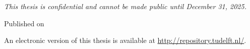 \begin{titlepage}
\begin{center}
        \bigskip
        \bigskip
        \emph{This thesis is confidential and cannot be made public until December 31, 2025.}

        \bigskip
        \bigskip
        Published on {\makeatletter\@publishDate\makeatother}

        \bigskip
        \bigskip
        An electronic version of this thesis is available at \url{http://repository.tudelft.nl/}.

    \end{center}


\end{titlepage}
